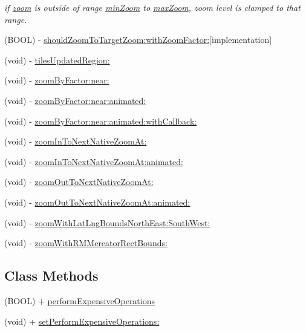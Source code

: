 \begin{DoxyCompactItemize}
\begin{DoxyCompactList}\small\item\em if \hyperlink{interface_r_m_map_contents_a199c766d9970b90672f8884856c7cd4e}{zoom} is outside of range \hyperlink{interface_r_m_map_contents_ab434ff9dc95d209ad2d53cf8d0f1703b}{min\-Zoom} to \hyperlink{interface_r_m_map_contents_afa0fef34433cbc987d0346dccbd151a1}{max\-Zoom}, zoom level is clamped to that range. \end{DoxyCompactList}\item 
(B\-O\-O\-L) -\/ \hyperlink{interface_r_m_map_contents_a0d412fc8ab80b4ef35c2dabf3a0f1c12}{should\-Zoom\-To\-Target\-Zoom\-:with\-Zoom\-Factor\-:}{\ttfamily  \mbox{[}implementation\mbox{]}}
\item 
(void) -\/ \hyperlink{interface_r_m_map_contents_a78107eb32326f58654bd9bcfe04c8289}{tiles\-Updated\-Region\-:}
\item 
(void) -\/ \hyperlink{interface_r_m_map_contents_ac84735b91375863f930ce3465411a85f}{zoom\-By\-Factor\-:near\-:}
\item 
(void) -\/ \hyperlink{interface_r_m_map_contents_a50036c154b99004fef1068a4972bd941}{zoom\-By\-Factor\-:near\-:animated\-:}
\item 
(void) -\/ \hyperlink{interface_r_m_map_contents_a625f32a99c58256644eeef69d40e13a9}{zoom\-By\-Factor\-:near\-:animated\-:with\-Callback\-:}
\item 
(void) -\/ \hyperlink{interface_r_m_map_contents_a8f2944077cd2d27c01463fa4881d3152}{zoom\-In\-To\-Next\-Native\-Zoom\-At\-:}
\item 
(void) -\/ \hyperlink{interface_r_m_map_contents_a6c5bafdae9d97c075ef057f78f3c38e6}{zoom\-In\-To\-Next\-Native\-Zoom\-At\-:animated\-:}
\item 
(void) -\/ \hyperlink{interface_r_m_map_contents_a4d5461e344f8d9f3567064f5749baf1f}{zoom\-Out\-To\-Next\-Native\-Zoom\-At\-:}
\item 
(void) -\/ \hyperlink{interface_r_m_map_contents_af50e2b740deeaf047fd114888c14c042}{zoom\-Out\-To\-Next\-Native\-Zoom\-At\-:animated\-:}
\item 
(void) -\/ \hyperlink{interface_r_m_map_contents_a16518ad8c17a80bc90fbb396f4d9d16b}{zoom\-With\-Lat\-Lng\-Bounds\-North\-East\-:\-South\-West\-:}
\item 
(void) -\/ \hyperlink{interface_r_m_map_contents_a527d09084d834ec9cc4738ba6ebba397}{zoom\-With\-R\-M\-Mercator\-Rect\-Bounds\-:}
\end{DoxyCompactItemize}
\subsection*{Class Methods}
\begin{DoxyCompactItemize}
\item 
(B\-O\-O\-L) + \hyperlink{interface_r_m_map_contents_a65e78425d0827ed394433fb9aca11a62}{perform\-Expensive\-Operations}
\item 
(void) + \hyperlink{interface_r_m_map_contents_aa00c82eeeb84859798f03e09226a8100}{set\-Perform\-Expensive\-Operations\-:}
\end{DoxyCompactItemize}
